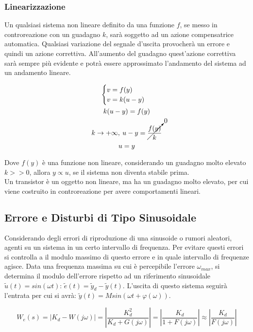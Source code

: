 \documentclass{article}
\numberwithin{equation}{subsection}
\begin{document}
\subsubsection{Linearizzazione}

Un qualsiasi sistema non lineare definito da una funzione $f$, se messo in controreazione con un guadagno $k$, sarà soggetto ad un azione compensatrice automatica. 
Qualsiasi variazione del segnale d'uscita provocherà un errore e quindi un azione correttiva. All'aumento del guadagno quest'azione correttiva sarà sempre più 
evidente e potrà essere approssimato l'andamento del sistema ad un andamento lineare. 

\begin{gather}
    \begin{cases}
        v=f(y)\\
        v=k(u-y)
    \end{cases}\\
    k(u-y)=f(y)\\
    k\to+\infty,\:u-y=\cancelto{0}{\displaystyle\frac{f(y)}{k}}\\
    u=y
\end{gather}

Dove $f(y)$ è una funzione non lineare, considerando un guadagno molto elevato $k>>0$, allora $y\propto u$, se il sistema non diventa stabile prima. \\
Un transistor è un oggetto non lineare, ma ha un guadagno molto elevato, per cui viene costruito in controreazione per avere comportamenti lineari. 

\subsection{Errore e Disturbi di Tipo Sinusoidale}

Considerando degli errori di riproduzione di una sinusoide o rumori aleatori, agenti su un sistema in un certo intervallo di frequenza. Per evitare questi errori si controlla 
a il modulo massimo di questo errore e in quale intervallo di frequenze agisce. Data una frequenza massima su cui è percepibile l'errore $\omega_{max}$, si determina il modulo 
dell'errore rispetto ad un riferimento sinusoidale $\tilde{u}(t)=sin({\omega}t)$: $\tilde{e}(t)=\tilde{y}_d-\tilde{y}(t)$. L'uscita di questo sistema seguirà l'entrata 
per cui si avrà: $\tilde{y}(t)=Msin({\omega}t+{\varphi}({\omega}))$. 

\begin{equation}
    W_e(s)=|K_d-W(j\omega)|=\left|\displaystyle\frac{K_d^2}{K_d+G(j\omega)}\right|=\left|\frac{K_d}{1+F(j\omega)}\right|\approx\left|\frac{K_d}{F(j\omega)}\right|
\end{equation}
\end{document}
